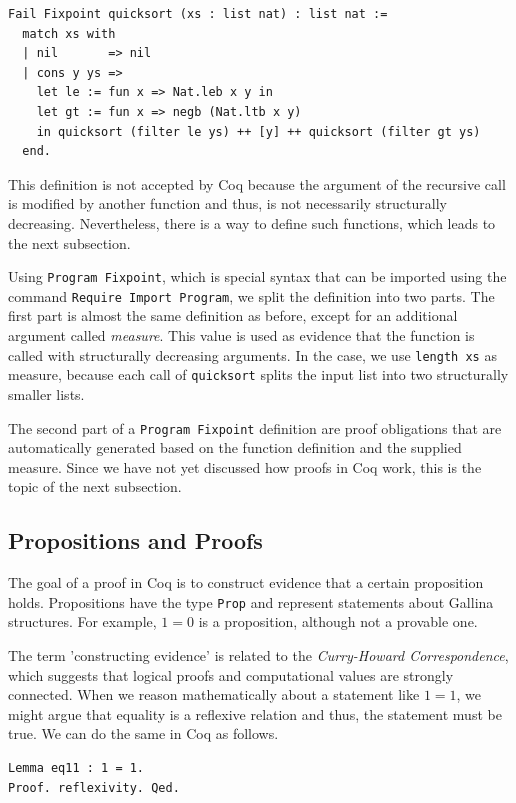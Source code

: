 \documentclass[a4paper, 11pt, fleqn, twoside]{scrreprt}
\newcommand{\cinl}[1]{\texttt{#1}}
\begin{document}
\begin{verbatim}
Fail Fixpoint quicksort (xs : list nat) : list nat :=
  match xs with
  | nil       => nil
  | cons y ys =>
    let le := fun x => Nat.leb x y in
    let gt := fun x => negb (Nat.ltb x y)
    in quicksort (filter le ys) ++ [y] ++ quicksort (filter gt ys)
  end.
\end{verbatim}

This definition is not accepted by Coq because the argument of the recursive call is modified by another function and thus, is not necessarily structurally decreasing.
Nevertheless, there is a way to define such functions, which leads to the next subsection.

Using \cinl{Program Fixpoint}, which is special syntax that can be imported using the command \cinl{Require Import Program}, we split the definition into two parts.
The first part is almost the same definition as before, except for an additional argument called \textit{measure}.
This value is used as evidence that the function is called with structurally decreasing arguments.
In the case, we use \cinl{length xs} as measure, because each call of \cinl{quicksort} splits the input list into two structurally smaller lists.

The second part of a \cinl{Program Fixpoint} definition are proof obligations that are automatically generated based on the function definition and the supplied measure.
Since we have not yet discussed how proofs in Coq work, this is the topic of the next subsection.

\subsection{Propositions and Proofs}

The goal of a proof in Coq is to construct evidence that a certain proposition holds.
Propositions have the type \cinl{Prop} and represent statements about Gallina structures.
For example, $1 = 0$ is a proposition, although not a provable one.

The term 'constructing evidence' is related to the \textit{Curry-Howard Correspondence}, which suggests that logical proofs and computational values are strongly connected.
When we reason mathematically about a statement like $1 = 1$, we might argue that equality is a reflexive relation and thus, the statement must be true.
We can do the same in Coq as follows.

\begin{verbatim}
Lemma eq11 : 1 = 1.
Proof. reflexivity. Qed.
\end{verbatim}
\end{document}
